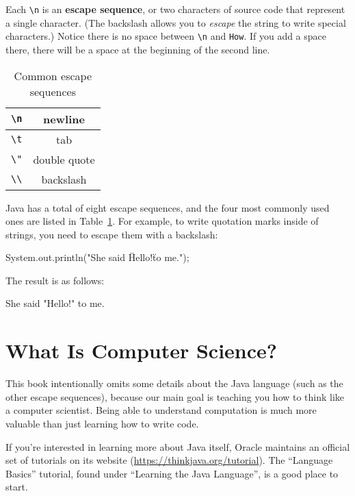 
Each \verb"\n" is an {\bf escape sequence}, or two characters of source code that represent a single character.
(The backslash allows you to {\em escape} the string to write special characters.)
Notice there is no space between \verb"\n" and \verb"How".
If you add a space there, there will be a space at the beginning of the second line.

\begin{table}[!ht]
\begin{center}
\begin{tabular}{|c|c|}
\hline
\verb"\n" & newline \\
\hline
\verb"\t" & tab \\
\hline
\verb'\"' & double quote \\
\hline
\verb"\\" & backslash \\
\hline
\end{tabular}
\caption{Common escape sequences}
\label{tab:escape}
\end{center}
\end{table}

Java has a total of eight escape sequences, and the four most commonly used ones are listed in Table~\ref{tab:escape}.
For example, to write quotation marks inside of strings, you need to escape them with a backslash:

\begin{code}
System.out.println("She said \"Hello!\" to me.");
\end{code}

The result is as follows:

\begin{stdout}
She said "Hello!" to me.
\end{stdout}


\section{What Is Computer Science?}

This book intentionally omits some details about the Java language (such as the other escape sequences), because our main goal is teaching you how to think like a computer scientist.
Being able to understand computation is much more valuable than just learning how to write code.

If you're interested in learning more about Java itself, Oracle maintains an official set of tutorials on its website (\url{https://thinkjava.org/tutorial}).
The ``Language Basics'' tutorial, found under ``Learning the Java Language'', is a good place to start.

